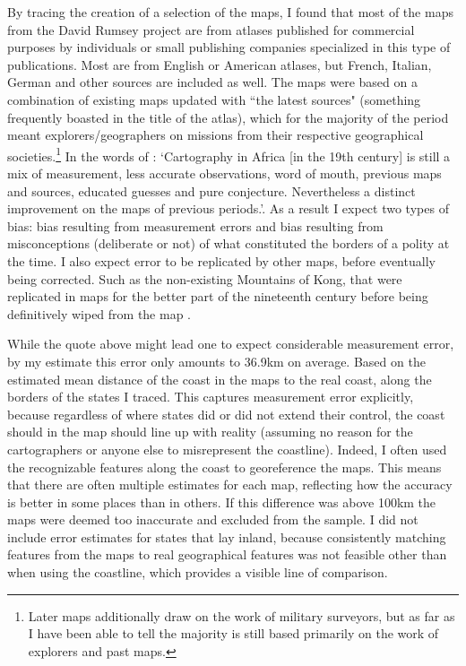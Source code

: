 \documentclass[12pt]{article}
\begin{document}
By tracing the creation of a selection of the maps, I found that most of the
maps from the David Rumsey project are from atlases published for commercial
purposes by individuals or small publishing companies specialized in this type
of publications. Most are from English or American atlases, but French, Italian,
German and other sources are included as well. The maps were based on a
combination of existing maps updated with ``the latest sources" (something
frequently boasted in the title of the atlas), which for the majority of the
period meant explorers/geographers on missions from their respective
geographical societies.\footnote{Later maps additionally draw on the work of
	military surveyors, but as far as I have been able to tell the majority
is still based primarily on the work of explorers and past maps.} In the words
of \citet[47-48]{Stone1995}: `Cartography in Africa [in the 19th century] is
still a mix of measurement, less accurate observations, word of mouth, previous
maps and sources, educated guesses and pure conjecture. Nevertheless a distinct
improvement on the maps of previous periods.'. As a result I expect two types of
bias: bias resulting from measurement errors and bias resulting from
misconceptions (deliberate or not) of what constituted the borders of a polity
at the time. I also expect error to be replicated by other maps, before
eventually being corrected. Such as the non-existing Mountains of Kong, that
were replicated in maps for the better part of the nineteenth century before
being definitively wiped from the map \citep{Bassett_1991}.

While the quote above might lead one to expect considerable measurement error,
by my estimate this error only amounts to 36.9km on average. Based on the
estimated mean distance of the coast in the maps to the real coast, along the
borders of the states I traced. This captures measurement error explicitly,
because regardless of where states did or did not extend their control, the
coast should in the map should line up with reality (assuming no reason for the
cartographers or anyone else to misrepresent the coastline). Indeed, I often
used the recognizable features along the coast to georeference the maps. This
means that there are often multiple estimates for each map, reflecting how the
accuracy is better in some places than in others. If this difference was above
100km the maps were deemed too inaccurate and excluded from the sample. I did
not include error estimates for states that lay inland, because consistently
matching features from the maps to real geographical features was not feasible
other than when using the coastline, which provides a visible line of
comparison.
\end{document}
